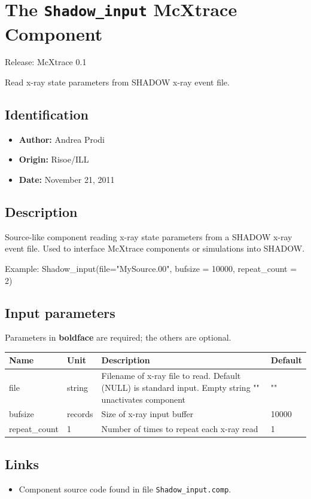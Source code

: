 \section{The \texttt{Shadow\_input} McXtrace Component}
Release: McXtrace 0.1

Read x-ray state parameters from SHADOW x-ray event file.

\subsection*{Identification}
\begin{itemize}
  \item \textbf{Author:} Andrea Prodi
  \item \textbf{Origin:} Risoe/ILL
  \item \textbf{Date:} November 21, 2011
\end{itemize}

\subsection*{Description}
Source-like component reading x-ray state parameters from a SHADOW x-ray event file. Used to interface McXtrace components or simulations into SHADOW.

Example: Shadow\_input(file="MySource.00", bufsize = 10000, repeat\_count = 2)

\subsection*{Input parameters}
Parameters in \textbf{boldface} are required; the others are optional.

\begin{longtable}{p{}p{}p{}p{}}
\toprule
\textbf{Name} & \textbf{Unit} & \textbf{Description} & \textbf{Default} \\
\midrule
\endhead
file & string & Filename of x-ray file to read. Default (NULL) is standard input. Empty string "" unactivates component & "" \\
bufsize & records & Size of x-ray input buffer & 10000 \\
repeat\_count & 1 & Number of times to repeat each x-ray read & 1 \\
\bottomrule
\end{longtable}

\subsection*{Links}
\begin{itemize}
  \item Component source code found in file \texttt{Shadow\_input.comp}.
\end{itemize}
